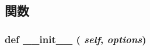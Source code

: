 \subsection{関数}
\hypertarget{classm5_1_1util_1_1jobfile_1_1Job_ac775ee34451fdfa742b318538164070e}{
\subsubsection[{\_\-\_\-init\_\-\_\-}]{\setlength{\rightskip}{0pt plus 5cm}def \_\-\_\-init\_\-\_\- ( {\em self}, \/   {\em options})}}
\label{classm5_1_1util_1_1jobfile_1_1Job_ac775ee34451fdfa742b318538164070e}



